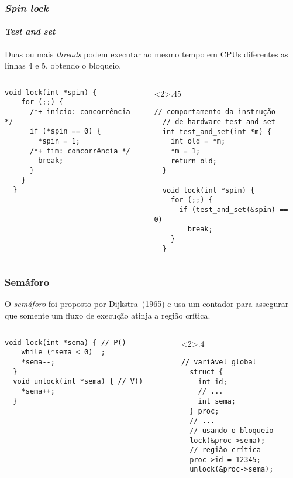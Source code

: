 \begin{frame}[fragile]
  \frametitle{{\em Spin lock}} \framesubtitle{{\em Test and set}}
  \small Duas ou mais {\em threads} podem executar ao mesmo tempo em
  CPUs diferentes as linhas 4 e 5, obtendo o bloqueio.

  \bigskip

  \begin{columns}
\begin{column}{.45\textwidth}
\begin{lstlisting}[framexleftmargin=5mm, frame=shadowbox,
    rulesepcolor=\color{red}]
  void lock(int *spin) {
    for (;;) {
      /*+ início: concorrência */
      if (*spin == 0) {
        *spin = 1;
      /*+ fim: concorrência */
        break;
      }
    }
  }
\end{lstlisting}
\end{column}
\begin{column}<2>{.45\textwidth}
\begin{lstlisting}[framexleftmargin=5mm, frame=shadowbox,
    rulesepcolor=\color{blue},basicstyle={\scriptsize\color{blue}}]
  // comportamento da instrução
  // de hardware test and set
  int test_and_set(int *m) {
    int old = *m;
    *m = 1;
    return old;
  }

  void lock(int *spin) {
    for (;;) {
      if (test_and_set(&spin) == 0)
        break;
    }
  }
\end{lstlisting}
\end{column}
  \end{columns}
\end{frame}

\begin{frame}[fragile]
  \frametitle{Semáforo}
  \small O \alert{\em semáforo} foi proposto por Dijkstra~(1965)
  e usa um contador para assegurar que somente um fluxo de execução
  atinja a região crítica. 
  \bigskip

  \begin{columns}
\begin{column}{.5\textwidth}
  \begin{lstlisting}[framexleftmargin=5mm,frame=shadowbox,
    rulesepcolor=\color{red}]
  void lock(int *sema) { // P()
    while (*sema < 0)  ;
    *sema--;
  }
  void unlock(int *sema) { // V()
    *sema++;
  }
\end{lstlisting}
\end{column}
\begin{column}<2>{.4\textwidth}
  \begin{lstlisting}[framexleftmargin=5mm, frame=shadowbox,
    rulesepcolor=\color{blue}]
  // variável global
  struct {
    int id;
    // ...
    int sema;
  } proc;
  // ...
  // usando o bloqueio
  lock(&proc->sema);
  // região crítica
  proc->id = 12345;
  unlock(&proc->sema);
\end{lstlisting}
\end{column}
  \end{columns}
\end{frame}

